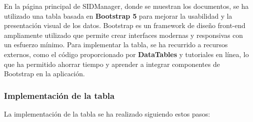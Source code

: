 \documentclass[draft]{scrbook}
\begin{document}
En la página principal de SIDManager, donde se muestran los documentos, se ha utilizado una tabla basada en \textbf{Bootstrap 5} para mejorar la usabilidad y la presentación visual de los datos. Bootstrap es un framework de diseño front-end ampliamente utilizado que permite crear interfaces modernas y responsivas con un esfuerzo mínimo. Para implementar la tabla, se ha recurrido a recursos externos, como el código proporcionado por \textbf{DataTables} y tutoriales en línea, lo que ha permitido ahorrar tiempo y aprender a integrar componentes de Bootstrap en la aplicación.


\subsubsection{Implementación de la tabla}

La implementación de la tabla se ha realizado siguiendo estos pasos:
\end{document}
